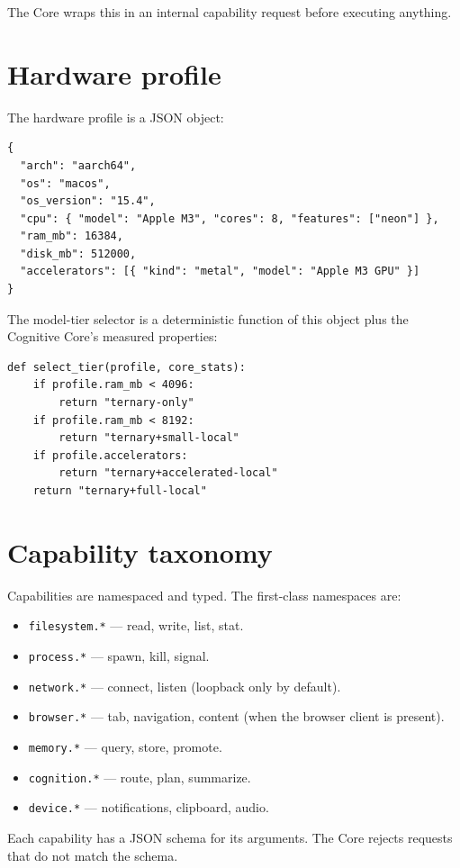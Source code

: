The Core wraps this in an internal capability request before
executing anything.

\section{Hardware profile}

The hardware profile is a JSON object:

\begin{lstlisting}[language=rccosjson,caption={Hardware profile.}]
{
  "arch": "aarch64",
  "os": "macos",
  "os_version": "15.4",
  "cpu": { "model": "Apple M3", "cores": 8, "features": ["neon"] },
  "ram_mb": 16384,
  "disk_mb": 512000,
  "accelerators": [{ "kind": "metal", "model": "Apple M3 GPU" }]
}
\end{lstlisting}

The model-tier selector is a deterministic function of this object
plus the Cognitive Core's measured properties:

\begin{lstlisting}[language=rccossh,caption={Model tier selector (pseudocode).}]
def select_tier(profile, core_stats):
    if profile.ram_mb < 4096:
        return "ternary-only"
    if profile.ram_mb < 8192:
        return "ternary+small-local"
    if profile.accelerators:
        return "ternary+accelerated-local"
    return "ternary+full-local"
\end{lstlisting}

\section{Capability taxonomy}

Capabilities are namespaced and typed. The first-class namespaces
are:

\begin{itemize}
  \item \texttt{filesystem.*} --- read, write, list, stat.
  \item \texttt{process.*} --- spawn, kill, signal.
  \item \texttt{network.*} --- connect, listen (loopback only by default).
  \item \texttt{browser.*} --- tab, navigation, content (when the
        browser client is present).
  \item \texttt{memory.*} --- query, store, promote.
  \item \texttt{cognition.*} --- route, plan, summarize.
  \item \texttt{device.*} --- notifications, clipboard, audio.
\end{itemize}

Each capability has a JSON schema for its arguments. The Core
rejects requests that do not match the schema.
